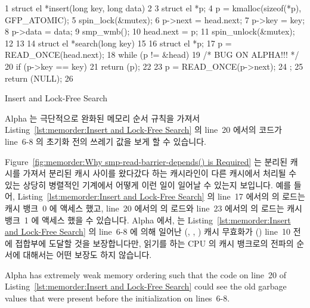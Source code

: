 \begin{listing}[tbp]
{ \scriptsize
\begin{verbbox}
  1 struct el *insert(long key, long data)
  2 {
  3     struct el *p;
  4     p = kmalloc(sizeof(*p), GFP_ATOMIC);
  5     spin_lock(&mutex);
  6     p->next = head.next;
  7     p->key = key;
  8     p->data = data;
  9     smp_wmb();
 10     head.next = p;
 11     spin_unlock(&mutex);
 12 }
 13
 14 struct el *search(long key)
 15 {
 16     struct el *p;
 17     p = READ_ONCE(head.next);
 18     while (p != &head) {
 19         /* BUG ON ALPHA!!! */
 20         if (p->key == key) {
 21             return (p);
 22         }
 23         p = READ_ONCE(p->next);
 24     };
 25     return (NULL);
 26 }
\end{verbbox}
}
\centering
\theverbbox
\caption{Insert and Lock-Free Search}
\label{lst:memorder:Insert and Lock-Free Search}
\end{listing}

Alpha 는 극단적으로 완화된 메모리 순서 규칙을 가져서
Listing~\ref{lst:memorder:Insert and Lock-Free Search} 의 line~20 에서의 코드가
line~6-8 의 초기화 전의 쓰레기 값을 보게 할 수 있습니다.

Figure~\ref{fig:memorder:Why smp-read-barrier-depends() is Required}
는 분리된 캐시를 가져서 분리된 캐시 사이를 왔다갔다 하는 캐시라인이 다른
캐시에서 처리될 수 있는 상당히 병렬적인 기계에서 어떻게 이런 일이 일어날 수
있는지 보입니다.
예를 들어,
Listing~\ref{lst:memorder:Insert and Lock-Free Search}
의 line~17 에서의  의 로드는 캐시 뱅크~0 에 액세스 했고, line~20
에서의  의 로드와 line~23 에서의  의 로드는 캐시 뱅크~1
에 액세스 했을 수 있습니다.
Alpha 에서,  는
Listing~\ref{lst:memorder:Insert and Lock-Free Search} 의 line~6-8 에 의해
일어난 (, , ) 캐시 무효화가 ()
line~10 전에 접합부에 도달할 것을 보장합니다만, 읽기를 하는 CPU 의 캐시
뱅크로의 전파의 순서에 대해서는 어떤 보장도 하지 않습니다.
\iffalse

Alpha has extremely weak memory ordering
such that the code on line~20 of
Listing~\ref{lst:memorder:Insert and Lock-Free Search} could see the old
garbage values that were present before the initialization on lines~6-8.

